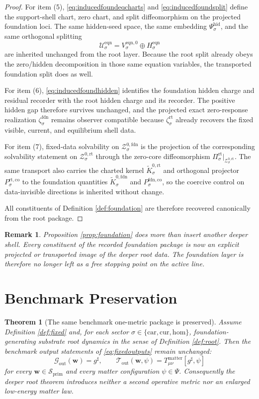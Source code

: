 \documentclass[11pt]{article}
\newcommand{\CompletedMetric}{g^{\sharp}}
\newcommand{\MatterSpace}{\Psi}
\newcommand{\Car}{\mathrm{car}}
\newcommand{\Cur}{\mathrm{cur}}
\newcommand{\Hom}{\mathrm{hom}}
\newcommand{\PrimShell}{\mathcal S_{\mathrm{prim}}}
\newcommand{\MetricOut}{\mathscr G_{\mathrm{out}}}
\newcommand{\MatterOut}{\mathscr T_{\mathrm{out}}}
\newcommand{\FoundZeroCore}[1]{\mathcal Z_{#1}^{0,\mathrm{fdn}}}
\newcommand{\FoundEmbed}[1]{\zeta_{#1}^{\mathrm{fdn}}}
\newcommand{\FoundKernelCh}[1]{\widetilde K_{#1}^{0,\mathrm{fdn}}}
\newcommand{\FoundStateComp}[1]{P_{#1}^{\mathrm{fdn,co}}}
\newcommand{\RootProj}[1]{\Pi_{#1}^{\mathrm{rt}}}
\newcommand{\RootZeroCore}[1]{\mathcal Z_{#1}^{0,\mathrm{rt}}}
\newcommand{\RootEmbed}[1]{\zeta_{#1}^{\mathrm{rt}}}
\newcommand{\RootKernelCh}[1]{\widetilde K_{#1}^{0,\mathrm{rt}}}
\newcommand{\RootStateComp}[1]{P_{#1}^{\mathrm{rt,co}}}
\newcommand{\EqnSpace}[1]{\mathcal U_{#1}^{\mathrm{eqn}}}
\newcommand{\EqnHidden}[1]{H_{#1}^{\mathrm{eqn}}}
\newcommand{\EqnZero}[1]{V_{#1}^{\mathrm{eqn},0}}
\newcommand{\HiddenChart}[1]{\Psi_{#1}^{\mathrm{hid}}}
\newtheorem{remark}{Remark}
\newtheorem{theorem}{Theorem}
\begin{document}
\begin{proof}
For item (5), \eqref{eq:inducedfoundeqcharts} and \eqref{eq:inducedfoundsplit} define the support-shell chart, zero chart, and split diffeomorphism on the projected foundation loci. The same hidden-seed space, the same embedding \(\HiddenChart{\sigma}\), and the same orthogonal splitting
\[
\EqnSpace{\sigma}=\EqnZero{\sigma}\oplus\EqnHidden{\sigma}
\]
are inherited unchanged from the root layer. Because the root split already obeys the zero/hidden decomposition in those same equation variables, the transported foundation split does as well.

For item (6), \eqref{eq:inducedfoundhidden} identifies the foundation hidden charge and residual recorder with the root hidden charge and its recorder. The positive hidden gap therefore survives unchanged, and the projected exact zero-response realization \(\FoundEmbed{\sigma}\) remains observer compatible because \(\RootEmbed{\sigma}\) already recovers the fixed visible, current, and equilibrium shell data.

For item (7), fixed-data solvability on \(\FoundZeroCore{\sigma}\) is the projection of the corresponding solvability statement on \(\RootZeroCore{\sigma}\) through the zero-core diffeomorphism \(\RootProj{\sigma}\big|_{\RootZeroCore{\sigma}}\). The same transport also carries the charted kernel \(\RootKernelCh{\sigma}\) and orthogonal projector \(\RootStateComp{\sigma}\) to the foundation quantities \(\FoundKernelCh{\sigma}\) and \(\FoundStateComp{\sigma}\), so the coercive control on data-invisible directions is inherited without change.

All constituents of Definition \ref{def:foundation} are therefore recovered canonically from the root package. 
\end{proof}

\begin{remark}
Proposition \ref{prop:foundation} does more than insert another deeper shell. Every constituent of the recorded foundation package is now an explicit projected or transported image of the deeper root data. The foundation layer is therefore no longer left as a free stopping point on the active line.
\end{remark}

\section{Benchmark Preservation}

\begin{theorem}[The same benchmark one-metric package is preserved]
\label{thm:outputs}
Assume Definition \ref{def:fixed} and, for each sector \(\sigma\in\{\Car,\Cur,\Hom\}\), foundation-generating substrate root dynamics in the sense of Definition \ref{def:root}. Then the benchmark output statements of \eqref{eq:fixedoutputs} remain unchanged:
\[
\MetricOut(\mathbf w)=\CompletedMetric,
\qquad
\MatterOut(\mathbf w,\psi)
=
T_{\mu\nu}^{\mathrm{matter}}[\CompletedMetric,\psi]
\]
for every \(\mathbf w\in\PrimShell\) and every matter configuration \(\psi\in\MatterSpace\). Consequently the deeper root theorem introduces neither a second operative metric nor an enlarged low-energy matter law.
\end{theorem}
\end{document}

